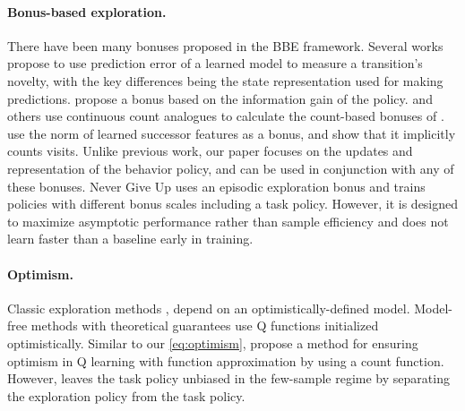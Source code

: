 \paragraph{Bonus-based exploration.}
There have been many bonuses proposed in the BBE framework.
Several works \citep{Stadie2015IncentivizingEI,pathak2017curiosity,burda2018exploration} propose to use prediction error of a learned model to measure a transition's novelty, with the key differences being the state representation used for making predictions.
\citet{houthooft2016vime} propose a bonus based on the information gain of the policy.
\citet{bellemare2016unifying} and others \citep{ostrovski2017count,Tang2017Exploration} use continuous count analogues to calculate the count-based bonuses of \citet{strehl2008analysis}.
\citet{Machado2020CountBasedEW} use the norm of learned successor features as a bonus, and show that it implicitly counts visits.
Unlike previous work, our paper focuses on the updates and representation of the behavior policy, and \algshort{} can be used in conjunction with any of these bonuses.
Never Give Up \citep{Badia2020NeverGU} uses an episodic exploration bonus and trains policies with different bonus scales including a task policy.
However, it is designed to maximize asymptotic performance rather than sample efficiency and does not learn faster than a baseline early in training.


\paragraph{Optimism.}
Classic exploration methods \citep{Kearns1998NearOptimalRL,Brafman2002RMAXA,strehl2008analysis,Jaksch2008NearoptimalRB}, depend on an optimistically-defined model.
Model-free methods with theoretical guarantees \citep{Strehl2006PACMR,Jin2018IsQP} use Q functions initialized optimistically.
Similar to our \cref{eq:optimism}, \citet{Rashid2020OptimisticEE} propose a method for ensuring optimism in Q learning with function approximation by using a count function.
However, \algshort{} leaves the task policy unbiased in the few-sample regime by separating the exploration policy from the task policy.


